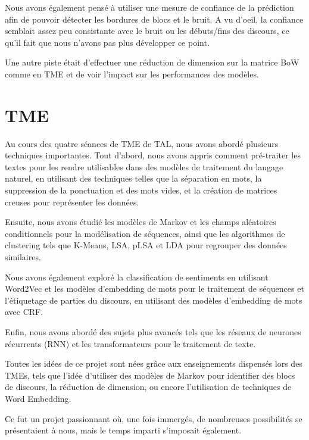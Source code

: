 \documentclass{article}
\begin{document}
Nous avons également pensé à utiliser une mesure de confiance de la prédiction afin de pouvoir détecter les bordures de blocs et le bruit. A vu d'oeil, la confiance semblait assez peu consistante avec le bruit ou les débuts/fins des discours, ce qu'il fait que nous n'avons pas plus développer ce point.

Une autre piste était d'effectuer une réduction de dimension sur la matrice BoW comme en TME et de voir l'impact sur les performances des modèles.

\section{TME}

Au cours des quatre séances de TME de TAL, nous avons abordé plusieurs techniques importantes. 
Tout d'abord, nous avons appris comment pré-traiter les textes pour les rendre utilisables dans des modèles de traitement du langage naturel, en utilisant des techniques telles que la séparation en mots, la suppression de la ponctuation et des mots vides, et la création de matrices creuses pour représenter les données. 

Ensuite, nous avons étudié les modèles de Markov et les champs aléatoires conditionnels pour la modélisation de séquences, ainsi que les algorithmes de clustering tels que K-Means, LSA, pLSA et LDA pour regrouper des données similaires. 

Nous avons également exploré la classification de sentiments en utilisant Word2Vec et les modèles d'embedding de mots pour le traitement de séquences et l'étiquetage de parties du discours, en utilisant des modèles d'embedding de mots avec CRF. 

Enfin, nous avons abordé des sujets plus avancés tels que les réseaux de neurones récurrents (RNN) et les transformateurs pour le traitement de texte.

Toutes les idées de ce projet sont nées grâce aux enseignements dispensés lors des TMEs, tels que l'idée d'utiliser des modèles de Markov pour identifier des blocs de discours, la réduction de dimension, ou encore l'utilisation de techniques de Word Embedding. 

Ce fut un projet passionnant où, une fois immergés, de nombreuses possibilités se présentaient à nous, mais le temps imparti s'imposait également.
\end{document}
